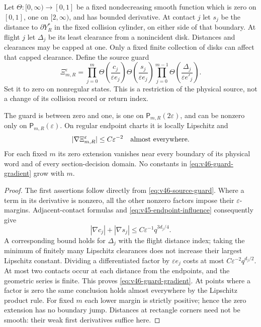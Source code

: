 Let $\Theta:[0,\infty)\to[0,1]$ be a fixed nondecreasing smooth
function which is zero on $[0,1]$, one on $[2,\infty)$, and has bounded
derivative. At contact $j$ let $s_j$ be the distance to
$\partial Y_R^*$ in the fixed collision cylinder, on either side of
that boundary. At flight $j$ let $\Delta_j$ be its least clearance
from a nonincident disk. Distances and clearances may be capped at one.
Only a fixed finite collection of disks can affect that capped
clearance. Define the source guard
\begin{equation}\label{eq:v46-source-guard}
 \Xi_{m,R}^{\varepsilon}=
 \prod_{j=0}^{m}\Theta\!\left(\frac{c_j}{\varepsilon e_j}\right)
                       \Theta\!\left(\frac{s_j}{\varepsilon e_j}\right)
 \prod_{j=0}^{m-1}\Theta\!\left(\frac{\Delta_j}{\varepsilon e'_j}\right).
\end{equation}
Set it to zero on nonregular states. This is a restriction of the
physical source, not a change of its collision record or return index.

\begin{lemma}
\label{lem:v46-guard-derivative}
The guard is between zero and one, is one on
$\mathsf P_{m,R}(2\varepsilon)$, and can be nonzero only on
$\mathsf P_{m,R}(\varepsilon)$. On regular endpoint charts it is
locally Lipschitz and
\begin{equation}\label{eq:v46-guard-gradient}
 |\nabla\Xi_{m,R}^{\varepsilon}|\le C\varepsilon^{-2}
                 \quad\hbox{almost everywhere}.
\end{equation}
For each fixed $m$ its zero extension vanishes near every boundary of
its physical word and of every section-decision domain. No constants
in \eqref{eq:v46-guard-gradient} grow with $m$.
\end{lemma}
\begin{proof}
The first assertions follow directly from \eqref{eq:v46-source-guard}.
Where a term in its derivative is nonzero, all the other nonzero
factors impose their $\varepsilon$-margins. Adjacent-contact formulas
and \eqref{eq:v45-endpoint-influence} consequently give
\[
 |\nabla c_j|+|\nabla s_j|
            \le C\varepsilon^{-1}q^{3d_j/4}.
\]
A corresponding bound holds for $\Delta_j$ with the flight distance
index; taking the minimum of finitely many Lipschitz clearances does
not increase their largest Lipschitz constant. Dividing a differentiated
factor by $\varepsilon e_j$ costs at most
$C\varepsilon^{-2}q^{d_j/2}$. At most two contacts occur at each
distance from the endpoints, and the geometric series is finite.
This proves \eqref{eq:v46-guard-gradient}. At points where a factor is
zero the same conclusion holds almost everywhere by the Lipschitz
product rule. For fixed $m$ each lower margin is strictly positive;
hence the zero extension has no boundary jump. Distances at rectangle
corners need not be smooth: their weak first derivatives suffice here.
\end{proof}

